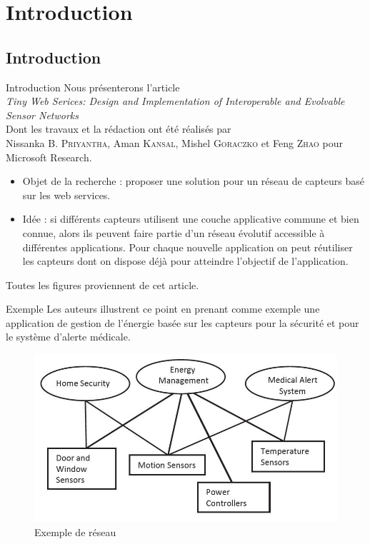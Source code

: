 
\section{Introduction}
\subsection{Introduction}
\begin{frame}{Introduction}
Nous présenterons l'article\\
\alert{\textit{Tiny Web Serices: Design and Implementation of Interoperable and Evolvable Sensor Networks}}\\
Dont les travaux et la rédaction ont été réalisés par\\
Nissanka B. \textsc{Priyantha}, Aman \textsc{Kansal}, Mishel \textsc{Goraczko} et Feng \textsc{Zhao} pour Microsoft Research.
\begin{itemize}
\item Objet de la recherche : proposer une solution pour un réseau de capteurs basé sur les web services. 
\item Idée : si différents capteurs utilisent une couche applicative commune et bien connue, alors ils peuvent faire partie d'un réseau évolutif accessible à différentes applications. Pour chaque nouvelle application on peut réutiliser les capteurs dont on dispose déjà pour atteindre l'objectif de l'application.
\end{itemize}
Toutes les figures proviennent de cet article.
\end{frame}

\begin{frame}{Exemple}
Les auteurs illustrent ce point en prenant comme exemple une application de gestion de l'énergie basée sur les capteurs pour la sécurité et pour le système d'alerte médicale. 
\begin{figure}
  \centering
  \includegraphics[scale=0.4]{figures/exemple.jpg}
  \caption{Exemple de réseau}
 \end{figure} 
\end{frame}


